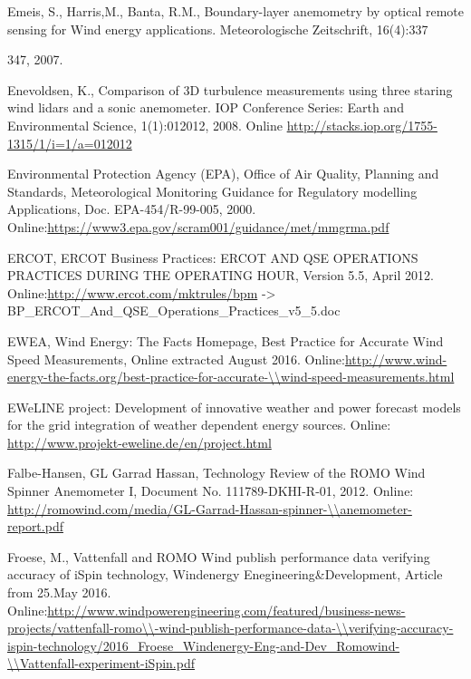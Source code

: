 Emeis, S., Harris,M., Banta, R.M.,  Boundary-layer anemometry by optical remote sensing for Wind energy applications. Meteorologische Zeitschrift, 16(4):337{347, 2007.


Enevoldsen, K., Comparison of 3D turbulence measurements using three staring wind lidars and a sonic anemometer. IOP Conference Series: Earth and Environmental Science, 1(1):012012, 2008.
Online \small{\url{http://stacks.iop.org/1755-1315/1/i=1/a=012012}}


Environmental Protection Agency (EPA), Office of Air Quality, Planning and Standards, Meteorological Monitoring Guidance for Regulatory modelling Applications, Doc. EPA-454/R-99-005, 2000. Online:\small{\url{https://www3.epa.gov/scram001/guidance/met/mmgrma.pdf}}


ERCOT, ERCOT Business Practices: ERCOT AND QSE OPERATIONS PRACTICES DURING THE OPERATING HOUR, Version 5.5, April 2012.                              
Online:\url{http://www.ercot.com/mktrules/bpm} -> \\BP\_ERCOT\_And\_QSE\_Operations_Practices_v5_5.doc


EWEA, Wind Energy: The Facts Homepage, Best Practice for Accurate Wind Speed Measurements, Online extracted August 2016.                        
Online:\small{\url{http://www.wind-energy-the-facts.org/best-practice-for-accurate-\\wind-speed-measurements.html}}

EWeLINE project: Development of innovative weather and power forecast models for the grid integration of weather dependent energy sources.      
Online: \small{\url{http://www.projekt-eweline.de/en/project.html}}


Falbe-Hansen, GL Garrad Hassan, Technology Review of the ROMO Wind Spinner Anemometer I, Document No. 111789-DKHI-R-01, 2012.
Online: \small{\url{http://romowind.com/media/GL-Garrad-Hassan-spinner-\\anemometer-report.pdf}}


Froese, M., Vattenfall and ROMO Wind publish performance data verifying accuracy of iSpin technology, Windenergy Enegineering&Development, Article from 25.May 2016. Online:\small{\url{http://www.windpowerengineering.com/featured/business-news-projects/vattenfall-romo\\-wind-publish-performance-data-\\verifying-accuracy-ispin-technology/2016_Froese_Windenergy-Eng-and-Dev_Romowind-\\Vattenfall-experiment-iSpin.pdf}}


}
